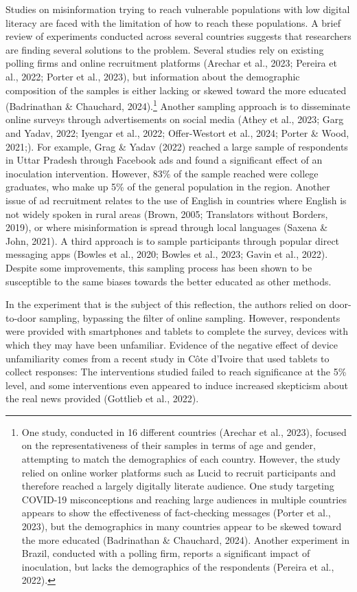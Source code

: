 \documentclass[authordate, reflection]{jote-new-article}
\begin{document}
	Studies on misinformation trying to reach vulnerable populations with low digital literacy are faced with the limitation of how to reach these populations. A brief review of experiments conducted across several countries suggests that researchers are finding several solutions to the problem. Several studies rely on existing polling firms and online recruitment platforms (Arechar et al., 2023; Pereira et al., 2022; Porter et al., 2023), but information about the demographic composition of the samples is either lacking or skewed toward the more educated (Badrinathan \& Chauchard, 2024).\footnote{ One study, conducted in 16 different countries (Arechar et al., 2023), focused on the representativeness of their samples in terms of age and gender, attempting to match the demographics of each country. However, the study relied on online worker platforms such as Lucid to recruit participants and therefore reached a largely digitally literate audience. One study targeting COVID-19 misconceptions and reaching large audiences in multiple countries appears to show the effectiveness of fact-checking messages (Porter et al., 2023), but the demographics in many countries appear to be skewed toward the more educated (Badrinathan \& Chauchard, 2024). Another experiment in Brazil, conducted with a polling firm, reports a significant impact of inoculation, but lacks the demographics of the respondents (Pereira et al., 2022).} Another sampling approach is to disseminate online surveys through advertisements on social media (Athey et al., 2023; Garg and Yadav, 2022; Iyengar et al., 2022; Offer-Westort et al., 2024; Porter \& Wood, 2021;). For example, Grag \& Yadav (2022) reached a large sample of respondents in Uttar Pradesh through Facebook ads and found a significant effect of an inoculation intervention. However, 83\% of the sample reached were college graduates, who make up 5\% of the general population in the region. Another issue of ad recruitment relates to the use of English in countries where English is not widely spoken in rural areas (Brown, 2005; Translators without Borders, 2019), or where misinformation is spread through local languages (Saxena \& John, 2021). A third approach is to sample participants through popular direct messaging apps (Bowles et al., 2020; Bowles et al., 2023; Gavin et al., 2022). Despite some improvements, this sampling process has been shown to be susceptible to the same biases towards the better educated as other methods.



	In the experiment that is the subject of this reflection, the authors relied on door-to-door sampling, bypassing the filter of online sampling. However, respondents were provided with smartphones and tablets to complete the survey, devices with which they may have been unfamiliar. Evidence of the negative effect of device unfamiliarity comes from a recent study in Côte d'Ivoire that used tablets to collect responses: The interventions studied failed to reach significance at the 5\% level, and some interventions even appeared to induce increased skepticism about the real news provided (Gottlieb et al., 2022).
\end{document}
